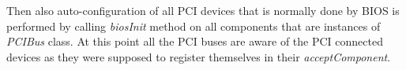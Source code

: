 %
%

Then also auto-configuration of all PCI devices that is normally done by BIOS
is performed by calling \emph{biosInit} method on all components that are
instances of \emph{PCIBus} class. At this point all the PCI buses are aware of
the PCI connected devices as they were supposed to register themselves in their
\emph{acceptComponent}.

\begin{codeblock}
    
\end{codeblock}


